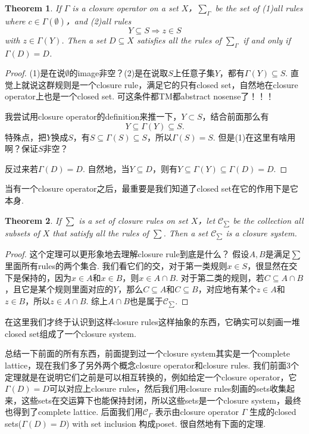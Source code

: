 \documentclass{article}
\newtheorem{theorem}{Theorem}[section]
\begin{document}
\begin{theorem}
\rm {\color{red} If $\Gamma$ is a closure operator on a set $X$}，$\sum_{\Gamma}$ be the set of (1)all rules where $c \in \Gamma(\emptyset)$，and (2)all rules
$$
Y \subseteq  S \Rightarrow z \in S
$$
with $z \in \Gamma(Y)$. Then a set $D \subseteq X$ satisfies all the rules of $\sum_\Gamma$ if and only if $\Gamma(D) = D$.
\end{theorem}

\begin{proof}
(1)是在说$\emptyset$的image非空？(2)是在说取$S$上任意子集$Y$，都有$\Gamma(Y) \subseteq S$. 直觉上就说这群规则是一个closure rule，满足它的只有closed set，自然地在closure operator上也是一个closed set. 可这条件都TM都abstract nosense了！！！

我尝试用closure operator的definition来推一下，$Y \subset S$，结合前面那么有
$$
Y \subseteq \Gamma(Y) \subseteq S.
$$
特殊点，把$Y$换成$S$，有$S \subseteq \Gamma(S) \subseteq S$，所以$\Gamma(S) = S$. 但是(1)在这里有啥用啊？保证$S$非空？

反过来若$\Gamma(D) = D$. 自然地，当$Y \subseteq D$，则有$Y \subseteq \Gamma(Y) \subseteq \Gamma(D) =  D$.
\end{proof}

{\color{blue} 当有一个closure operator之后，最重要是我们知道了closed set在它的作用下是它本身}.

\begin{theorem}
\rm {\color{red} If $\sum$ is a set of closure rules on set $X$}，let $\mathcal{C}_{\sum}$ be the collection all subsets of $X$ that satisfy all the rules of $\sum$. Then a set $\mathcal{C}_{\sum}$ is a closure system. 
\end{theorem}

\begin{proof}
这个定理可以更形象地去理解closure rule到底是什么？ 假设$A,B$是满足$\sum$里面所有rules的两个集合. 我们看它们的交，对于第一类规则$x \in S$，很显然在交下是保持的，因为$x \in A$和$x \in B$，则$x \in A \cap B$. 对于第二类的规则，若$C \subseteq A \cap B$，且它是某个规则里面对应的$Y$，那么$C \subseteq A$和$C \subseteq B$，对应地有某个$z \in A$和$z \in B$，所以$z \in A\cap B$. 综上$A \cap B$也是属于$\mathcal{C}_{\sum}$.
\end{proof}

{\color{blue} 在这里我们才终于认识到这样closure rules这样抽象的东西，它确实可以刻画一堆closed set组成了一个closure system}.

{\color{red} 总结一下前面的所有东西，前面提到过一个closure system其实是一个complete lattice，现在我们多了另外两个概念closure operator和closure rules. 我们前面3个定理就是在说明它们之前是可以相互转换的，例如给定一个closure operator，它$\Gamma(D) = D$可以对应上closure rules，然后我们用closure rules刻画的sets收集起来，这些sets在交运算下也能保持封闭，所以这些sets是一个closure system，最终也得到了complete lattice}. {\color{blue} 后面我们用$\mathcal{C}_\Gamma$ 表示由closure operator $\Gamma$ 生成的closed sets($\Gamma(D)=D$) with set inclusion 构成poset}. 很自然地有下面的定理.
\end{document}
